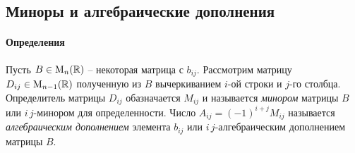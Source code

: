 \subsection{Миноры и алгебраические дополнения}

\paragraph{Определения}

Пусть $B\in\operatorname{M}_{n}(\mathbb R)$ -- некоторая матрица с $b_{ij}$.
Рассмотрим матрицу $D_{ij}\in\operatorname{M}_{n-1}(\mathbb R)$ полученную из $B$ вычеркиванием $i$-ой строки и $j$-го столбца.
Определитель матрицы $D_{ij}$ обазначается $M_{ij}$ и называется {\it минором} матрицы $B$ или $i\,j$-минором для определенности.
Число $A_{ij} = (-1)^{i+j}M_{ij}$ называется {\it алгебраическим дополнением} элемента $b_{ij}$ или $i\,j$-алгебраическим дополнением матрицы $B$.

